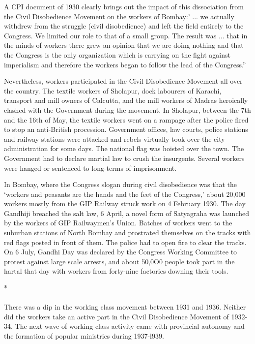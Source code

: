 A CPI document of 1930 clearly brings out the impact of this dissociation from the Civil Disobedience Movement on the workers of Bombay:' ... we actually withdrew from the struggle (civil disobedience) and left the field entirely to the Congress. We limited our role to that of a small group. The result was ... that in the minds of workers there grew an opinion that we are doing nothing and that the Congress is the only organization which is carrying on the fight against imperialism and therefore the workers began to follow the lead of the Congress.''

Nevertheless, workers participated in the Civil Disobedience Movement all over the country. The textile workers of Sholapur, dock labourers of Karachi, transport and mill owners of Calcutta, and the mill workers of Madras heroically clashed with the Government during the movement. In Sholapur, between the 7th and the 16th of May, the textile workers went on a rampage after the police fired to stop an anti-British procession. Government offices, law courts, police stations and railway stations were attacked and rebels virtually took over the city administration for some days. The national flag was hoisted over the town. The Government had to declare martial law to crush the insurgents. Several workers were hanged or sentenced to long-terms of imprisonment.

In Bombay, where the Congress slogan during civil disobedience was that the `workers and peasants are the hands and the feet of the Congress,' about 20,000 workers mostly from the GIP Railway struck work on 4 February 1930. The day Gandhiji breached the salt law, 6 April, a novel form of Satyagraha was launched by the workers of GIP Railwaymen's Union. Batches of workers went to the suburban stations of North Bombay and prostrated themselves on the tracks with red flags posted in front of them. The police had to open fire to clear the tracks. On 6 July, Gandhi Day was declared by the Congress Working Committee to protest against large scale arrests, and about 50,0O0 people took part in the hartal that day with workers from forty-nine factories downing their tools.

\begin{center}*\end{center}

\paragraph*{}


There was a dip in the working class movement between 1931 and 1936. Neither did the workers take an active part in the Civil Disobedience Movement of 1932-34. The next wave of working class activity came with provincial autonomy and the formation of popular ministries during 1937-l939.


